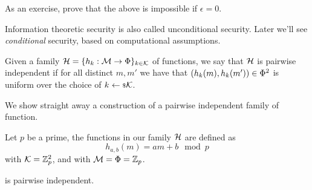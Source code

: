 As an exercise, prove that the above is impossible if $\epsilon = 0$.

Information theoretic security is also called unconditional security.
Later we'll see \emph{conditional} security, based on computational assumptions.

\begin{definition}
	Given a family $\mathcal{H} = \{ h_k : \mathcal{M} \to \Phi \}_{k \in \mathcal{K}}$ of functions, we say that $\mathcal{H}$ is pairwise independent if for all distinct $m, m'$ we have that $(h_k(m), h_k(m')) \in \Phi^2$ is uniform over the choice of $k \leftarrow {\scriptstyle \$} {\mathcal{K}}$.
\end{definition}

We show straight away a construction of a pairwise independent family of function.
\begin{construction} \label{cons:pairwise-independent}
	Let $p$ be a prime, the functions in our family $\mathcal{H}$ are defined as
	\begin{equation*}
		h_{a,b}(m) = a m + b \mod p
	\end{equation*}
	with $\mathcal{K} = \mathbb{Z}^2_p$, and with $\mathcal{M} = \Phi = \mathbb{Z}_p$.
\end{construction}

\begin{theorem} \label{thm:mod-pairwise-independent}
	 is pairwise independent.
\end{theorem}

